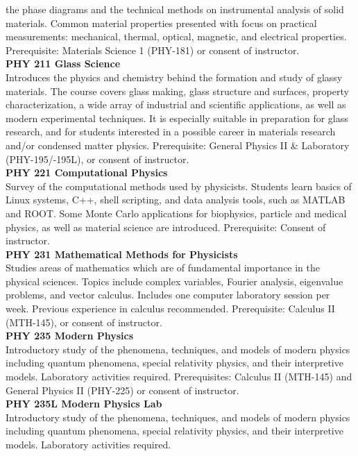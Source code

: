 \documentclass[
  letterpaper,
]{scrbook}
\begin{document}
the phase diagrams and the technical methods on instrumental analysis of
solid materials. Common material properties presented with focus on
practical measurements: mechanical, thermal, optical, magnetic, and
electrical properties. Prerequisite: Materials Science 1 (PHY-181) or
consent of instructor.\\
\textbf{PHY 211 Glass Science}\\
Introduces the physics and chemistry behind the formation and study of
glassy materials. The course covers glass making, glass structure and
surfaces, property characterization, a wide array of industrial and
scientific applications, as well as modern experimental techniques. It
is especially suitable in preparation for glass research, and for
students interested in a possible career in materials research and/or
condensed matter physics. Prerequisite: General Physics II \& Laboratory
(PHY-195/-195L), or consent of instructor.\\
\textbf{PHY 221 Computational Physics}\\
Survey of the computational methods used by physicists. Students learn
basics of Linux systems, C++, shell scripting, and data analysis tools,
such as MATLAB and ROOT. Some Monte Carlo applications for biophysics,
particle and medical physics, as well as material science are
introduced. Prerequisite: Consent of instructor.\\
\textbf{PHY 231 Mathematical Methods for Physicists}\\
Studies areas of mathematics which are of fundamental importance in the
physical sciences. Topics include complex variables, Fourier analysis,
eigenvalue problems, and vector calculus. Includes one computer
laboratory session per week. Previous experience in calculus
recommended. Prerequisite: Calculus II (MTH-145), or consent of
instructor.\\
\textbf{PHY 235 Modern Physics}\\
Introductory study of the phenomena, techniques, and models of modern
physics including quantum phenomena, special relativity physics, and
their interpretive models. Laboratory activities required.
Prerequisites: Calculus II (MTH-145) and General Physics II (PHY-225) or
consent of instructor.\\
\textbf{PHY 235L Modern Physics Lab}\\
Introductory study of the phenomena, techniques, and models of modern
physics including quantum phenomena, special relativity physics, and
their interpretive models. Laboratory activities required.
\end{document}
